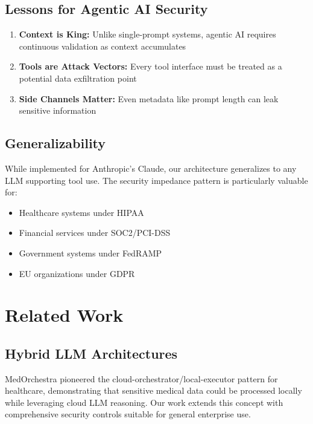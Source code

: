 \documentclass[11pt]{article}
\begin{document}
\subsection{Lessons for Agentic AI Security}

\begin{enumerate}
\item \textbf{Context is King:} Unlike single-prompt systems, agentic AI requires continuous validation as context accumulates
\item \textbf{Tools are Attack Vectors:} Every tool interface must be treated as a potential data exfiltration point
\item \textbf{Side Channels Matter:} Even metadata like prompt length can leak sensitive information
\end{enumerate}

\subsection{Generalizability}

While implemented for Anthropic's Claude, our architecture generalizes to any LLM supporting tool use. The security impedance pattern is particularly valuable for:
\begin{itemize}
\item Healthcare systems under HIPAA
\item Financial services under SOC2/PCI-DSS
\item Government systems under FedRAMP
\item EU organizations under GDPR
\end{itemize}

\section{Related Work}

\subsection{Hybrid LLM Architectures}

MedOrchestra \cite{medorchestra2025} pioneered the cloud-orchestrator/local-executor pattern for healthcare, demonstrating that sensitive medical data could be processed locally while leveraging cloud LLM reasoning. Our work extends this concept with comprehensive security controls suitable for general enterprise use.
\end{document}
